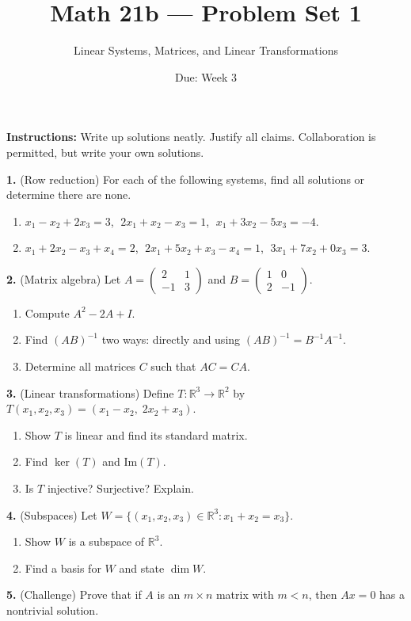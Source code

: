 \documentclass{amsart}
\title{Math 21b --- Problem Set 1}
\subtitle{Linear Systems, Matrices, and Linear Transformations}
\date{Due: Week 3}
\begin{document}
\maketitle

\textbf{Instructions:} Write up solutions neatly. Justify all claims. Collaboration is permitted, but write your own solutions.

\bigskip

\textbf{1.} (Row reduction) For each of the following systems, find all solutions or determine there are none.
\begin{enumerate}
    \item[(a)] $x_1 - x_2 + 2x_3 = 3$, $\;2x_1 + x_2 - x_3 = 1$, $\;x_1 + 3x_2 - 5x_3 = -4$.
    \item[(b)] $x_1 + 2x_2 - x_3 + x_4 = 2$, $\;2x_1 + 5x_2 + x_3 - x_4 = 1$, $\;3x_1 + 7x_2 + 0x_3 = 3$.
\end{enumerate}

\bigskip

\textbf{2.} (Matrix algebra) Let $A = \begin{pmatrix}2&1\\-1&3\end{pmatrix}$ and $B = \begin{pmatrix}1&0\\2&-1\end{pmatrix}$.
\begin{enumerate}
    \item[(a)] Compute $A^2 - 2A + I$.
    \item[(b)] Find $(AB)^{-1}$ two ways: directly and using $(AB)^{-1} = B^{-1}A^{-1}$.
    \item[(c)] Determine all matrices $C$ such that $AC = CA$.
\end{enumerate}

\bigskip

\textbf{3.} (Linear transformations) Define $T: \mathbb{R}^3 \to \mathbb{R}^2$ by $T(x_1, x_2, x_3) = (x_1 - x_2,\; 2x_2 + x_3)$.
\begin{enumerate}
    \item[(a)] Show $T$ is linear and find its standard matrix.
    \item[(b)] Find $\ker(T)$ and $\text{Im}(T)$.
    \item[(c)] Is $T$ injective? Surjective? Explain.
\end{enumerate}

\bigskip

\textbf{4.} (Subspaces) Let $W = \{(x_1,x_2,x_3) \in \mathbb{R}^3 : x_1 + x_2 = x_3\}$.
\begin{enumerate}
    \item[(a)] Show $W$ is a subspace of $\mathbb{R}^3$.
    \item[(b)] Find a basis for $W$ and state $\dim W$.
\end{enumerate}

\bigskip

\textbf{5.} (Challenge) Prove that if $A$ is an $m \times n$ matrix with $m < n$, then $Ax = 0$ has a nontrivial solution.
\end{document}
